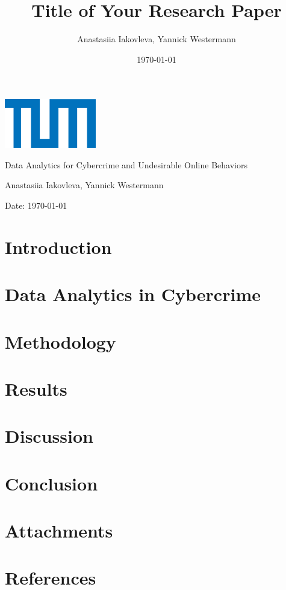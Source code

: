 \documentclass{article}
\title{Title of Your Research Paper}
\author{Anastasiia Iakovleva, Yannick Westermann}
\date{\today}
\renewcommand\maketitle{
  \begin{titlepage}
    \centering
    \includegraphics[width=0.3\textwidth]{./assets/tum-logo.png} 
    \vspace{1cm}

    \Large
    Data Analytics for Cybercrime and Undesirable Online Behaviors
    \vspace{2cm}

    \Huge
    \thetitle
    \vspace{2cm}

    \Large
    Anastasiia Iakovleva, Yannick Westermann
    \vspace{1cm}

    \normalsize
    Date: \today
    \vspace{1cm}

    \begin{abstract}
        \lipsum[1]
    \end{abstract}
  \end{titlepage}
}
\begin{document}
\maketitle



\newpage
\tableofcontents
\newpage

\section{Introduction}\label{sec:introduction}


\section{Data Analytics in Cybercrime}\label{sec:data-analytics}


\section{Methodology}\label{sec:methodology}


\section{Results}\label{sec:results}


\section{Discussion}\label{sec:discussion}


\section{Conclusion}\label{sec:conclusion}


\section{Attachments}\label{sec:attachments}


\section*{References}\label{sec:references}

\end{document}
